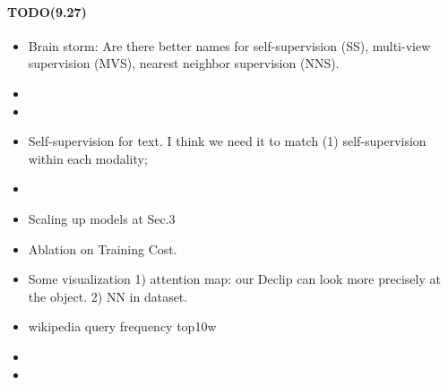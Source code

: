 \paragraph{TODO(9.27)}

\begin{itemize}
    \item Brain storm: Are there better names for self-supervision (SS), multi-view supervision (MVS), nearest neighbor supervision (NNS).
    \item {}
    \item {}
    \item Self-supervision for text. I think we need it to match (1) self-supervision within each modality;
    \item {}
    \item Scaling up models at Sec.3
    \item Ablation on Training Cost.
    \item Some visualization 1) attention map: our Declip can look more precisely at the object. 2) NN in dataset.
    \item wikipedia query frequency top10w 
    \item {}
    \item {}
\end{itemize}

